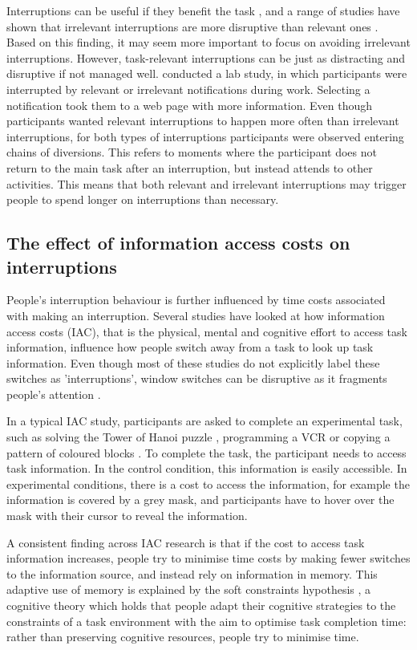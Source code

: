 Interruptions can be useful if they benefit the task \citep{Jin2009}, and a range of studies have shown that irrelevant interruptions are more disruptive than relevant ones \citep[e.g.][]{Adamczyk2004, Gould2013a}. Based on this finding, it may seem more important to focus on avoiding irrelevant interruptions. However, task-relevant interruptions can be just as distracting and disruptive if not managed well. \citet{Iqbal2008} conducted a lab study, in which participants were interrupted by relevant or irrelevant notifications during work. Selecting a notification took them to a web page with more information. Even though participants wanted relevant interruptions to happen more often than irrelevant interruptions, for both types of interruptions participants were observed entering chains of diversions. This refers to moments where the participant does not return to the main task after an interruption, but instead attends to other activities. This means that both relevant and irrelevant interruptions may trigger people to spend longer on interruptions than necessary.

\subsection{The effect of information access costs on interruptions}
People’s interruption behaviour is further influenced by time costs associated with making an interruption. Several studies have looked at how information access costs (IAC), that is the physical, mental and cognitive effort to access task information, influence how people switch away from a task to look up task information. Even though most of these studies do not explicitly label these switches as 'interruptions', window switches can be  disruptive as it fragments people's attention \citep{Rule2015}. 

In a typical IAC study, participants are asked to complete an experimental task, such as solving the Tower of Hanoi puzzle \citep{Waldron2007}, programming a VCR \citep{Gray2004} or copying a pattern of coloured blocks \citep{Gray2006}. To complete the task, the participant needs to access task information. In the control condition, this information is easily accessible. In experimental conditions, there is a cost to access the information, for example the information is covered by a grey mask, and participants have to hover over the mask with their cursor to reveal the information. 

A consistent finding across IAC research is that if the cost to access task information increases, people try to minimise time costs by making fewer switches to the information source, and instead rely on information in memory. This adaptive use of memory is explained by the soft constraints hypothesis \citep{Gray2006}, a cognitive theory which holds that people adapt their cognitive strategies to the constraints of a task environment with the aim to optimise task completion time: rather than preserving cognitive resources, people try to minimise time.

